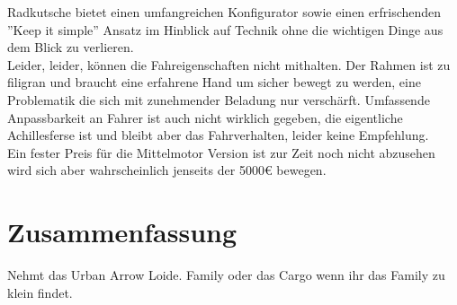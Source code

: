 \documentclass[a4paper,ngerman, 14pt] {scrartcl}
\begin{document}
\begin{itemize}
    Radkutsche bietet einen umfangreichen Konfigurator sowie einen erfrischenden ''Keep it simple'' Ansatz im Hinblick auf Technik ohne die wichtigen Dinge aus dem Blick zu verlieren.\\
    Leider, leider, können die Fahreigenschaften nicht mithalten. Der Rahmen ist zu filigran und braucht eine erfahrene Hand um sicher bewegt zu werden, eine Problematik die sich mit zunehmender Beladung nur verschärft. Umfassende Anpassbarkeit an Fahrer ist auch nicht wirklich gegeben, die eigentliche Achillesferse ist und bleibt aber das Fahrverhalten, leider keine Empfehlung.\\
    Ein fester Preis für die Mittelmotor Version ist zur Zeit noch nicht abzusehen wird sich aber wahrscheinlich jenseits der 5000€ bewegen.
\newpage
\section{Zusammenfassung}
Nehmt das Urban Arrow Loide. Family oder das Cargo wenn ihr das Family zu klein findet.
\end{itemize}
\end{document}
